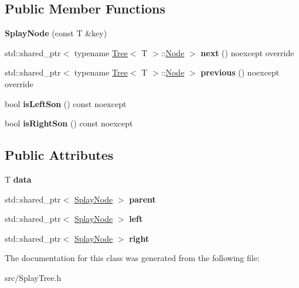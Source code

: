 \subsection*{Public Member Functions}
\begin{DoxyCompactItemize}
\item 
\mbox{\label{classSplayTree_1_1SplayNode_af613da62a8442f16ac8b4d2f1a2c9a41}} 
{\bfseries Splay\+Node} (const T \&key)
\item 
\mbox{\label{classSplayTree_1_1SplayNode_a958decc1fc4c1c2aa4c80c5fc4e42acd}} 
std\+::shared\+\_\+ptr$<$ typename \hyperlink{classTree}{Tree}$<$ T $>$\+::\hyperlink{classTree_1_1Node}{Node} $>$ {\bfseries next} () noexcept override
\item 
\mbox{\label{classSplayTree_1_1SplayNode_a6a89136b18f560485a4bda43ef15f560}} 
std\+::shared\+\_\+ptr$<$ typename \hyperlink{classTree}{Tree}$<$ T $>$\+::\hyperlink{classTree_1_1Node}{Node} $>$ {\bfseries previous} () noexcept override
\item 
\mbox{\label{classSplayTree_1_1SplayNode_ac057d0b4f3e979f4145e4690c8edc343}} 
bool {\bfseries is\+Left\+Son} () const noexcept
\item 
\mbox{\label{classSplayTree_1_1SplayNode_a650c250d2034ffea6db16daf30114ad3}} 
bool {\bfseries is\+Right\+Son} () const noexcept
\end{DoxyCompactItemize}
\subsection*{Public Attributes}
\begin{DoxyCompactItemize}
\item 
\mbox{\label{classSplayTree_1_1SplayNode_a4c3d24b5fe0a6220132892e341c3fe34}} 
T {\bfseries data}
\item 
\mbox{\label{classSplayTree_1_1SplayNode_a8aeaae9e2fa624ee436abd87bd90eefb}} 
std\+::shared\+\_\+ptr$<$ \hyperlink{classSplayTree_1_1SplayNode}{Splay\+Node} $>$ {\bfseries parent}
\item 
\mbox{\label{classSplayTree_1_1SplayNode_abc672e50545562d79fe247fe4959c6a0}} 
std\+::shared\+\_\+ptr$<$ \hyperlink{classSplayTree_1_1SplayNode}{Splay\+Node} $>$ {\bfseries left}
\item 
\mbox{\label{classSplayTree_1_1SplayNode_ac72b70dd81da0a57e1e2678a4da0e0cf}} 
std\+::shared\+\_\+ptr$<$ \hyperlink{classSplayTree_1_1SplayNode}{Splay\+Node} $>$ {\bfseries right}
\end{DoxyCompactItemize}


The documentation for this class was generated from the following file\+:\begin{DoxyCompactItemize}
\item 
src/Splay\+Tree.\+h\end{DoxyCompactItemize}
